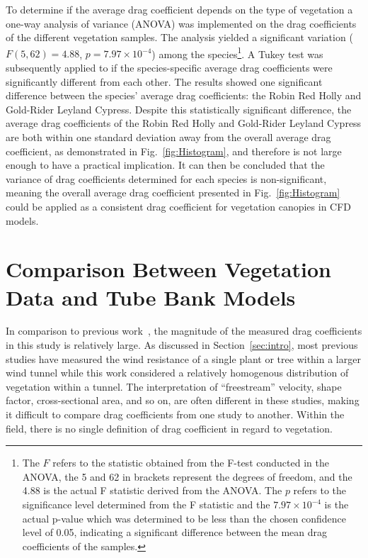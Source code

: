 \documentclass[12pt]{article}
\begin{document}
To determine if the average drag coefficient depends on the type of vegetation a one-way analysis of variance (ANOVA) was implemented on the drag coefficients of the different vegetation samples. The analysis yielded a significant variation ($F(5,62)=4.88$, $p=7.97 \times 10^{-4}$) among the species\footnote{The $F$ refers to the statistic obtained from the F-test conducted in the ANOVA, the 5 and 62 in brackets represent the degrees of freedom, and the 4.88 is the actual F statistic derived from the ANOVA. The $p$ refers to the significance level determined from the F statistic and the $7.97 \times 10^{-4}$ is the actual p-value which was determined to be less than the chosen confidence level of 0.05, indicating a significant difference between the mean drag coefficients of the samples.}. A Tukey test was subsequently applied to if the species-specific average drag coefficients were significantly different from each other. The results showed one significant difference between the species' average drag coefficients: the Robin Red Holly and Gold-Rider Leyland Cypress. Despite this statistically significant difference, the average drag coefficients of the Robin Red Holly and Gold-Rider Leyland Cypress are both within one standard deviation away from the overall average drag coefficient, as demonstrated in Fig.~\ref{fig:Histogram},  and therefore is not large enough to have a practical implication. It can then be concluded that the variance of drag coefficients determined for each species is non-significant, meaning the overall average drag coefficient presented in Fig.~\ref{fig:Histogram} could be applied as a consistent drag coefficient for vegetation canopies in CFD models.

\section{Comparison Between Vegetation Data and Tube Bank Models}
\label{sec:comp}

In comparison to previous work~\cite{Cao2012,Jalonen2014,Mayhead1973,Gillies2002,Ishikawa2006}, the magnitude of the measured drag coefficients in this study is relatively large. As discussed in Section~\ref{sec:intro}, most previous studies have measured the wind resistance of a single plant or tree within a larger wind tunnel while this work considered a relatively homogenous distribution of vegetation within a tunnel. The interpretation of ``freestream'' velocity, shape factor, cross-sectional area, and so on, are often different in these studies, making it difficult to compare drag coefficients from one study to another. Within the field, there is no single definition of drag coefficient in regard to vegetation.
\end{document}

